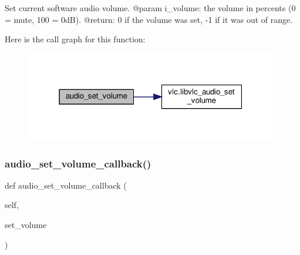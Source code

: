 \begin{DoxyVerb}Set current software audio volume.
@param i_volume: the volume in percents (0 = mute, 100 = 0dB).
@return: 0 if the volume was set, -1 if it was out of range.
\end{DoxyVerb}
 Here is the call graph for this function\+:
\nopagebreak
\begin{figure}[H]
\begin{center}
\leavevmode
\includegraphics[width=313pt]{classvlc_1_1_media_player_ab4c2d886df0b4e9883063292807d293f_cgraph}
\end{center}
\end{figure}
\mbox{\label{classvlc_1_1_media_player_a3fd19a06fa06a933d41903bfb219af6d}} 
\subsubsection{\texorpdfstring{audio\+\_\+set\+\_\+volume\+\_\+callback()}{audio\_set\_volume\_callback()}}
{\footnotesize\ttfamily def audio\+\_\+set\+\_\+volume\+\_\+callback (\begin{DoxyParamCaption}\item[{}]{self,  }\item[{}]{set\+\_\+volume }\end{DoxyParamCaption})}

